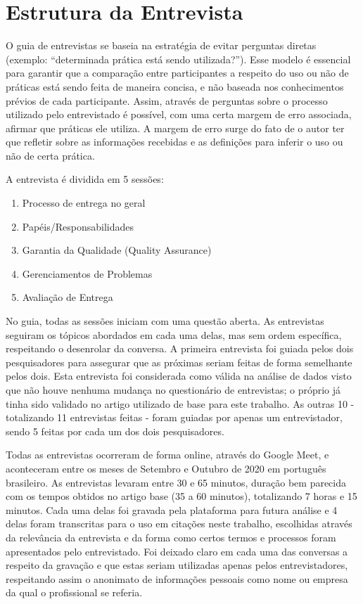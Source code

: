 \section{Estrutura da Entrevista}

O guia de entrevistas se baseia na estratégia de evitar perguntas diretas (exemplo: “determinada prática está sendo utilizada?”). Esse modelo é essencial para garantir que a comparação entre participantes a respeito do uso ou não de práticas está sendo feita de maneira concisa, e não baseada nos conhecimentos prévios de cada participante. Assim, através de perguntas sobre o processo utilizado pelo entrevistado é possível, com uma certa margem de erro associada, afirmar que práticas ele utiliza. A margem de erro surge do fato de o autor ter que refletir sobre as informações recebidas e as definições para inferir o uso ou não de certa prática.

A entrevista é dividida em 5 sessões: 

\begin{enumerate}
\item Processo de entrega no geral
\item Papéis/Responsabilidades
\item Garantia da Qualidade (Quality Assurance)
\item Gerenciamentos de Problemas
\item Avaliação de Entrega
\end{enumerate}

No guia, todas as sessões iniciam com uma questão aberta. As entrevistas seguiram os tópicos abordados em cada uma delas, mas sem ordem específica, respeitando o desenrolar da conversa. A primeira entrevista foi guiada pelos dois pesquisadores para assegurar que as próximas seriam feitas de forma semelhante pelos dois. Esta entrevista foi considerada como válida na análise de dados visto que não houve nenhuma mudança no questionário de entrevistas; o próprio já tinha sido validado no artigo utilizado de base para este trabalho. As outras 10 - totalizando 11 entrevistas feitas - foram guiadas por apenas um entrevistador, sendo 5 feitas por cada um dos dois pesquisadores.


Todas as entrevistas ocorreram de forma online, através do Google Meet, e aconteceram entre os meses de Setembro e Outubro de 2020 em português brasileiro. As entrevistas levaram entre 30 e 65 minutos, duração bem parecida com os tempos obtidos no artigo base (35 a 60 minutos), totalizando 7 horas e 15 minutos. Cada uma delas foi gravada pela plataforma para futura análise e 4 delas foram transcritas para o uso em citações neste trabalho, escolhidas através da relevância da entrevista e da forma como certos termos e processos foram apresentados pelo entrevistado. Foi deixado claro em cada uma das conversas a respeito da gravação e que estas seriam utilizadas apenas pelos entrevistadores, respeitando assim o anonimato de informações pessoais como nome ou empresa da qual o profissional se referia.

